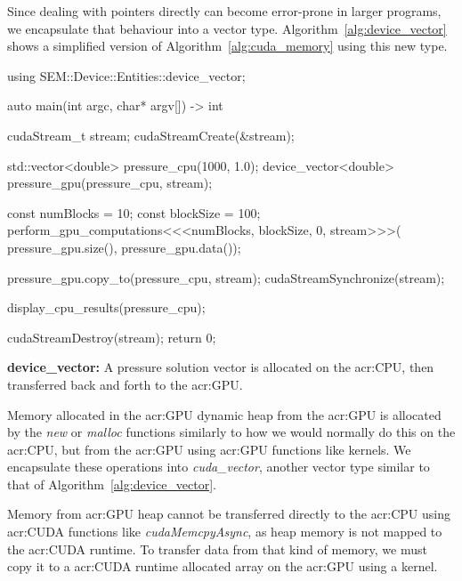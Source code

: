 Since dealing with pointers directly can become error-prone in larger programs, we encapsulate that
behaviour into a vector type. Algorithm~\ref{alg:device_vector} shows a simplified version of
Algorithm~\ref{alg:cuda_memory} using this new type.

\begin{algorithm}[H]
    \begin{cuda}
        using SEM::Device::Entities::device_vector;

        auto main(int argc, char* argv[]) -> int {
            cudaStream_t stream;
            cudaStreamCreate(&stream); 

            std::vector<double> pressure_cpu(1000, 1.0);
            device_vector<double> pressure_gpu(pressure_cpu, stream);

            const numBlocks = 10;
            const blockSize = 100;
            perform_gpu_computations<<<numBlocks, blockSize, 0, stream>>>(
                pressure_gpu.size(), pressure_gpu.data());
            
            pressure_gpu.copy_to(pressure_cpu, stream);
            cudaStreamSynchronize(stream);

            display_cpu_results(pressure_cpu);

            cudaStreamDestroy(stream);
            return 0;
        }\end{cuda}
\caption{\textbf{device\_vector:} A pressure solution vector is allocated on the \acrshort{acr:CPU}, then transferred back and forth to the \acrshort{acr:GPU}.}\label{alg:device_vector}
\end{algorithm}

Memory allocated in the \acrshort{acr:GPU} dynamic heap from the \acrshort{acr:GPU} is allocated by
the \textit{new} or \textit{malloc} functions similarly to how we would normally do this on the
\acrshort{acr:CPU}, but from the \acrshort{acr:GPU} using \acrshort{acr:GPU} functions like kernels.
We encapsulate these operations into \textit{cuda\_vector}, another vector type similar to that of
Algorithm~\ref{alg:device_vector}.

Memory from \acrshort{acr:GPU} heap cannot be transferred directly to the \acrshort{acr:CPU} using
\acrshort{acr:CUDA} functions like \textit{cudaMemcpyAsync}, as heap memory is not mapped to the
\acrshort{acr:CUDA} runtime. To transfer data from that kind of memory, we must copy it to a
\acrshort{acr:CUDA} runtime allocated array on the \acrshort{acr:GPU} using a kernel.

